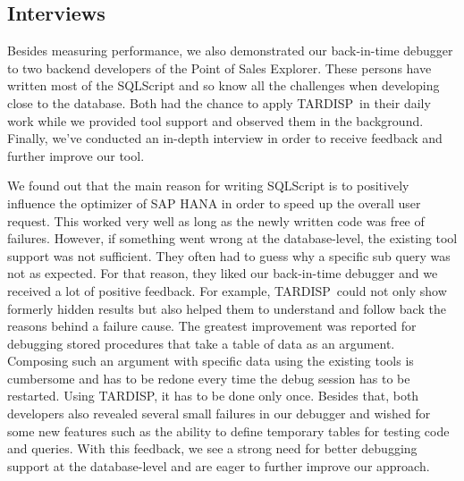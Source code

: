 \documentclass[english,conference]{IEEEtran}
\newcommand{\tool}{TAR\-DISP}
\begin{document}

\subsection{Interviews}

Besides measuring performance, we also demonstrated our back-in-time debugger to two backend developers of the Point of Sales Explorer. 
These persons have written most of the SQLScript and so know all the challenges when developing close to the database. 
Both had the chance to apply \tool\ in their daily work while we provided tool support and observed them in the background. 
Finally, we've conducted an in-depth interview in order to receive feedback and further improve our tool.

We found out that the main reason for writing SQLScript is to positively influence the optimizer of SAP HANA in order to speed up the overall user request.
This worked very well as long as the newly written code was free of failures. 
However, if something went wrong at the database-level, the existing tool support was not sufficient. 
They often had to guess why a specific sub query was not as expected. 
For that reason, they liked our back-in-time debugger and we received a lot of positive feedback.
For example, \tool\ could not only show formerly hidden results but also helped them to understand and follow back the reasons behind a failure cause. 
The greatest improvement was reported for debugging stored procedures that take a table of data as an argument.
Composing such an argument with specific data using the existing tools is cumbersome and has to be redone every time the debug session has to be restarted.
Using \tool, it has to be done only once.
Besides that, both developers also revealed several small failures in our debugger and wished for some new features such as the ability to define temporary tables for testing code and queries.
With this feedback, we see a strong need for better debugging support at the database-level and are eager to further improve our approach.
\end{document}
